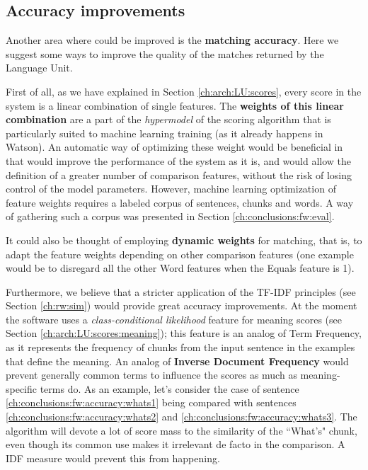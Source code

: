 \subsection{Accuracy improvements} \label{ch:conclusions:fw:accuracy}
Another area where \pname could be improved is the \textbf{matching accuracy}. Here we suggest some ways to improve the quality of the matches returned by the Language Unit.

First of all, as we have explained in Section \ref{ch:arch:LU:scores}, every score in the system is a linear combination of single features. The \textbf{weights of this linear combination} are a part of the \textit{hypermodel} of the scoring algorithm that is particularly suited to machine learning training (as it already happens in Watson). An automatic way of optimizing these weight would be beneficial in that would improve the performance of the system as it is, and would allow the definition of a greater number of comparison features, without the risk of losing control of the model parameters. However, machine learning optimization of feature weights requires a labeled corpus of sentences, chunks and words. A way of gathering such a corpus was presented in Section \ref{ch:conclusions:fw:eval}.

It could also be thought of employing \textbf{dynamic weights} for matching, that is, to adapt the feature weights depending on other comparison features (one example would be to disregard all the other Word features when the Equals feature is 1).

Furthermore, we believe that a stricter application of the TF-IDF principles (see Section \ref{ch:rw:sim}) would provide great accuracy improvements. At the moment the software uses a \textit{class-conditional likelihood} feature for meaning scores (see Section \ref{ch:arch:LU:scores:meaning}); this feature is an analog of Term Frequency, as it represents the frequency of chunks from the input sentence in the examples that define the meaning. An analog of \textbf{Inverse Document Frequency} would prevent generally common terms to influence the scores as much as meaning-specific terms do. As an example, let's consider the case of sentence \ref{ch:conclusions:fw:accuracy:whats1} being compared with sentences \ref{ch:conclusions:fw:accuracy:whats2} and \ref{ch:conclusions:fw:accuracy:whats3}. The algorithm will devote a lot of score mass to the similarity of the ``What's" chunk, even though its common use makes it irrelevant de facto in the comparison. A IDF measure would prevent this from happening.
 \label{ch:conclusions:fw:accuracy:whats1}
\vspace{-0.7cm}
 \label{ch:conclusions:fw:accuracy:whats2}
\vspace{-0.7cm}
 \label{ch:conclusions:fw:accuracy:whats3}

